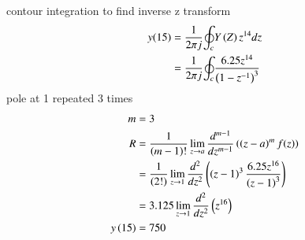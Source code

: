 \documentclass[journal,12pt,twocolumn]{IEEEtran}
\theoremstyle{remark}
\begin{document}
  contour integration to find inverse z transform
\begin{align}
y(15)&=\frac{1}{2{\pi}j}{\oint_c}Y\left(Z\right)z^{14}dz\\
&=\frac{1}{2{\pi}j}{\oint_c}{\frac{6.25z^{14}}{\left(1-z^{-1}\right)^{3}}}\\
\end{align}
pole at 1 repeated 3 times\\
\begin{align}
m&=3\\
R&=\frac{1}{\left(m-1\right)!}\lim_{z\to a}\frac{d^{m-1}}{dz^{m-1}}\left(\left(z-a\right)^mf{\left(z\right)}\right)\\
&=\frac{1}{\left(2!\right)}\lim_{z\to 1}\frac{d^2}{dz^2}\left(\left(z-1\right)^{3}\frac{6.25z^{16}}{\left(z-1\right)^3}\right)\\
&=3.125\lim_{z\to1}\frac{d^2}{dz^2}\left(z^{16}\right)\\
y\left(15\right)&=750
\end{align}
 
\end{document}
